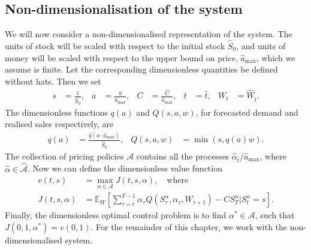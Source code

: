 \documentclass[main.tex]{subfiles}
\begin{document}
\subsection{Non-dimensionalisation of the system}
We will now consider a non-dimensionalised
representation of the system.
The units of stock will be  scaled with
respect to
the initial stock $\hat{S}_0$, and units of money will be scaled with respect to
the upper bound on
price, $\hat{a}_{\mathrm{max}}$, which we assume is finite.
Let the corresponding dimensionless quantities be defined without hats.
Then we set
\begin{align}
  s
  &= \frac{\hat{s}}{\hat{S}_0},
  & a
  &=\frac{\hat{a}}{\hat{a}_{\mathrm{max}}},
  &C&=\frac{\hat{C}}{\hat{a}_{\mathrm{max}}},
  & t &= \hat{t},
  &W_{t}&=\hat{W}_{\hat{t}}.
\end{align}
The dimensionless functions $q(a)$ and $Q(s,a,w)$,
for forecasted demand
and realised sales respectively, are
\begin{align}
  q(a)&= \frac{\hat{q}(a\cdot \hat{a}_{\max})}{\hat{S}_0},
  &Q(s,a, w)&= \min(s, q(a) w).
\end{align}
The collection of pricing policies $\mathcal{A}$ contains all
the processes $\hat{\alpha}_{\hat{t}}/\hat{a}_{\mathrm{max}}$, where
$\hat{\alpha}\in \hat{\mathcal{A}}$.
Now we can define the dimensionless value function
\begin{align}\label{eq:value_function_def_nondim}
  v(t,s)&=\max_{\alpha\in\mathcal{A}}
          J(t,s,\alpha),\quad\text{where}\\
  J(t,s,\alpha)&=
                 \mathbb{E}_{W}\left[ \sum_{\tau=t}^{T-1}
                 \alpha_\tau Q(
                 {S}_\tau^\alpha,\alpha_\tau,
                 W_{\tau+1})
                 - C S_{T}^\alpha \big\vert S_{t}^\alpha =
                 s
                 \right].
                 \label{eq:value_function_def_nondim2}
\end{align}
Finally, the dimensionless optimal control problem
is to find $\alpha^*\in{\mathcal{A}}$, such that
$J(0,1,\alpha^*)=v(0,1)$.
For the remainder of this chapter, we work with the
non-dimensionalised system.%
\end{document}

